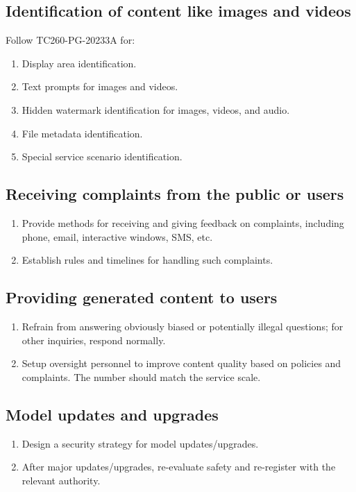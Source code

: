 \documentclass{article}
\begin{document}
\subsection{Identification of content like images and videos}
Follow TC260-PG-20233A for:
\begin{enumerate}
    \item Display area identification.
    \item Text prompts for images and videos.
    \item Hidden watermark identification for images, videos, and audio.
    \item File metadata identification.
    \item Special service scenario identification.
\end{enumerate}

\subsection{Receiving complaints from the public or users}
\begin{enumerate}
    \item Provide methods for receiving and giving feedback on complaints, including phone, email, interactive windows, SMS, etc.
    \item Establish rules and timelines for handling such complaints.
\end{enumerate}

\subsection{Providing generated content to users}
\begin{enumerate}
    \item Refrain from answering obviously biased or potentially illegal questions; for other inquiries, respond normally.
    \item Setup oversight personnel to improve content quality based on policies and complaints. The number should match the service scale.
\end{enumerate}

\subsection{Model updates and upgrades}
\begin{enumerate}
    \item Design a security strategy for model updates/upgrades.
    \item After major updates/upgrades, re-evaluate safety and re-register with the relevant authority.
\end{enumerate}
\end{document}
